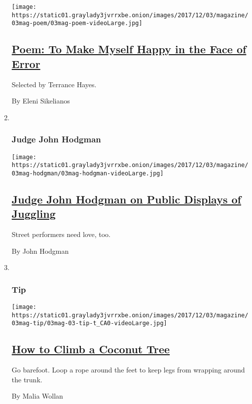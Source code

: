 \begin{enumerate}
  \texttt{[image: https://static01.graylady3jvrrxbe.onion/images/2017/12/03/magazine/03mag-poem/03mag-poem-videoLarge.jpg]}

  \hypertarget{poem-to-make-myself-happy-in-the-face-of-error}{%
  \subsection{\texorpdfstring{\href{/2017/12/01/magazine/poem-to-make-myself-happy-in-the-face-of-error.html}{Poem:
  To Make Myself Happy in the Face of
  Error}}{Poem: To Make Myself Happy in the Face of Error}}\label{poem-to-make-myself-happy-in-the-face-of-error}}

  Selected by Terrance Hayes.

  By Eleni Sikelianos
\item ~
  \hypertarget{judge-john-hodgman}{%
  \subsubsection{Judge John Hodgman}\label{judge-john-hodgman}}

  \texttt{[image: https://static01.graylady3jvrrxbe.onion/images/2017/12/03/magazine/03mag-hodgman/03mag-hodgman-videoLarge.jpg]}

  \hypertarget{judge-john-hodgman-on-public-displays-of-juggling}{%
  \subsection{\texorpdfstring{\href{/2017/12/01/magazine/judge-john-hodgman-on-public-displays-of-juggling.html}{Judge
  John Hodgman on Public Displays of
  Juggling}}{Judge John Hodgman on Public Displays of Juggling}}\label{judge-john-hodgman-on-public-displays-of-juggling}}

  Street performers need love, too.

  By John Hodgman
\item ~
  \hypertarget{tip}{%
  \subsubsection{Tip}\label{tip}}

  \texttt{[image: https://static01.graylady3jvrrxbe.onion/images/2017/12/03/magazine/03mag-tip/03mag-03-tip-t\_CA0-videoLarge.jpg]}

  \hypertarget{how-to-climb-a-coconut-tree}{%
  \subsection{\texorpdfstring{\href{/2017/12/01/magazine/how-to-climb-a-coconut-tree.html}{How
  to Climb a Coconut
  Tree}}{How to Climb a Coconut Tree}}\label{how-to-climb-a-coconut-tree}}

  Go barefoot. Loop a rope around the feet to keep legs from wrapping
  around the trunk.

  By Malia Wollan
\end{enumerate}

